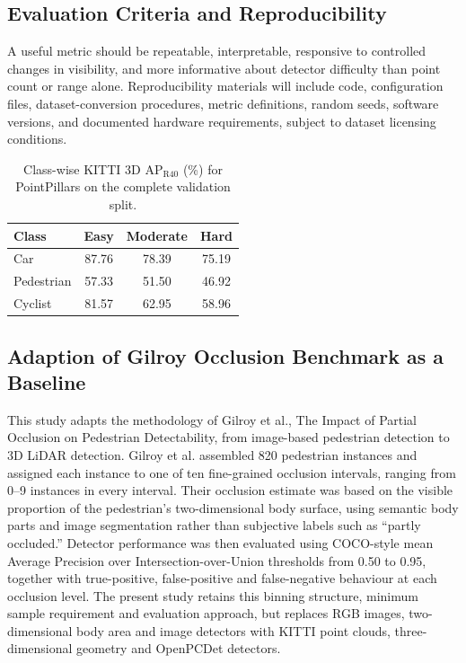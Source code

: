 \subsection{Evaluation Criteria and Reproducibility}

A useful metric should be repeatable, interpretable, responsive to controlled changes in visibility, and more informative about detector difficulty than point count or range alone. Reproducibility materials will include code, configuration files, dataset-conversion procedures, metric definitions, random seeds, software versions, and documented hardware requirements, subject to dataset licensing conditions.

\begin{table}[htbp]
    \centering
    \caption{Class-wise KITTI 3D $\mathrm{AP}_{\mathrm{R40}}$ (\%) for PointPillars on the complete validation split.}
    \label{tab:kitti-pointpillar-classes}
    \small
    \setlength{\tabcolsep}{3pt}
    \sloppy
    \renewcommand{\arraystretch}{1.15}
    \setlength{\tabcolsep}{3pt}
    \begin{tabular}{|l|S[table-format=2.2]|S[table-format=2.2]|S[table-format=2.2]|}
        \hline
        \textbf{Class} & {\textbf{Easy}} & {\textbf{Moderate}} & {\textbf{Hard}} \\
        \hline
        Car        & 87.76 & 78.39 & 75.19 \\
        \hline
        Pedestrian & 57.33 & 51.50 & 46.92 \\
        \hline
        Cyclist    & 81.57 & 62.95 & 58.96 \\
        \hline
    \end{tabular}
\end{table}

\subsection{Adaption of Gilroy Occlusion Benchmark as a Baseline}

This study adapts the methodology of Gilroy et al., The Impact of Partial Occlusion on Pedestrian Detectability,
 from image-based pedestrian detection to 3D LiDAR detection. Gilroy et al. assembled 820 pedestrian instances and
 assigned each instance to one of ten fine-grained occlusion intervals, ranging from 0–9%
 instances in every interval. Their occlusion estimate was based on the visible proportion of the pedestrian’s
 two-dimensional body surface, using semantic body parts and image segmentation rather than subjective labels such as
 “partly occluded.” Detector performance was then evaluated using COCO-style mean Average Precision over
 Intersection-over-Union thresholds from 0.50 to 0.95, together with true-positive, false-positive and false-negative
 behaviour at each occlusion level. The present study retains this binning structure, minimum sample requirement and
 evaluation approach, but replaces RGB images, two-dimensional body area and image detectors with KITTI point clouds,
 three-dimensional geometry and OpenPCDet detectors.


